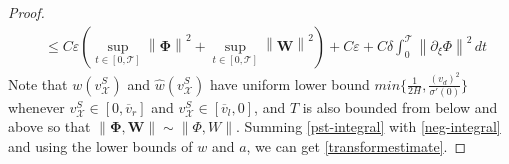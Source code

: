 \documentclass[10pt,a4paper]{amsart}
\def\T{\mathcal{T}}
\def\X{\mathcal{X}}
\def\avl{\overline{v}_l}
\def\avr{\overline{v}_r}
\def\ph{\mathbf{\Phi}}
\def\p{\partial}
\def\supt{\mathop{sup}\limits_{t \in [0,\mathcal{T}]}}
\def\vsx{v^S_{\mathcal{X}}}
\def\wh{\hat{w}}
\def\w{\mathbf{W}}
\newcommand{\norm}[1]{\left\lVert #1 \right\rVert}
\begin{document}
\begin{proof}
\begin{equation}
\begin{aligned}
			&\leq C\varepsilon(\supt\norm{\ph}^2+\supt\norm{\w}^2)+C\varepsilon+C\delta\int_{0}^{\T}\norm{\p_{\xi}\Phi}^2\,dt
		\end{aligned}
	\end{equation}
	Note that $w(\vsx)$ and $\wh(\vsx)$ have uniform lower bound $min\big\{\frac{1}{2H},\frac{(v_d)^2}{\sigma'(0)}\big\}$ whenever $\vsx \in [0,\avr]$ and $\vsx \in [\avl,0]$, and $T$ is also bounded from below and above so that $\norm{\ph,\w} \sim \norm{\Phi,W}$.  Summing \eqref{pst-integral} with \eqref{neg-integral} and using the lower bounds of $w$ and $a$, we can get \eqref{transformestimate}.
%	
%	
%	
\end{proof}
\end{document}
